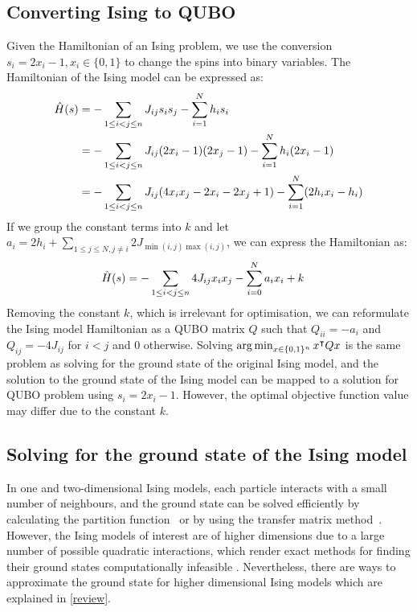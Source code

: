 \subsection{Converting Ising to QUBO}\label{isingtoqubo}
Given the Hamiltonian of an Ising problem, we use the conversion $s_i = 2x_i - 1, x_i \in \{0, 1\}$ to change the spins into binary variables. The Hamiltonian of the Ising model can be expressed as: \begin{align}
    \Hat{H}(s) &= -\sum_{1\leq i < j \leq n} J_{ij}s_i s_j - \sum_{i=1}^N h_i s_i \nonumber\\
    &= -\sum_{1\leq i < j \leq n} J_{ij}(2x_i - 1) (2x_j - 1) - \sum_{i=1}^N h_i (2x_i - 1) \nonumber\\
    &= -\sum_{1\leq i < j \leq n} J_{ij}(4x_i x_j - 2x_i - 2x_j + 1) - \sum_{i=1}^N (2h_i x_i - h_i) \nonumber
\end{align}
If we group the constant terms into $k$ and let $a_i = 2h_i + \sum_{1\leq j \leq N, j \neq i} 2J_{\min(i,j)\max(i,j)}$, we can express the Hamiltonian as:
\begin{align}
    \Hat{H}(s) &= -\sum_{1\leq i < j \leq n} 4J_{ij}x_i x_j - \sum_{i=0}^N a_{i}x_i + k
\end{align}
Removing the constant $k$, which is irrelevant for optimisation, we can reformulate the Ising model Hamiltonian as a QUBO matrix $Q$ such that $Q_{ii} = -a_i$ and $Q_{ij} = -4J_{ij}$ for $i < j$ and $0$ otherwise. Solving $\operatorname*{arg\,min}_{x \in \{0, 1\}^n} x^\intercal Q x$ is the same problem as solving for the ground state of the original Ising model, and the solution to the ground state of the Ising model can be mapped to a solution for QUBO problem using $s_i = 2x_i - 1$. However, the optimal objective function value may differ due to the constant $k$.

\subsection{Solving for the ground state of the Ising model}
In one and two-dimensional Ising models, each particle interacts with a small number of neighbours, and the ground state can be solved efficiently by calculating the partition function~\cite{onsager} or by using the transfer matrix method~\cite{kramerising}. However, the Ising models of interest are of higher dimensions due to a large number of possible quadratic interactions, which render exact methods for finding their ground states computationally infeasible \cite{barahona1982computational}. Nevertheless, there are ways to approximate the ground state for higher dimensional Ising models which are explained in \autoref{review}.

